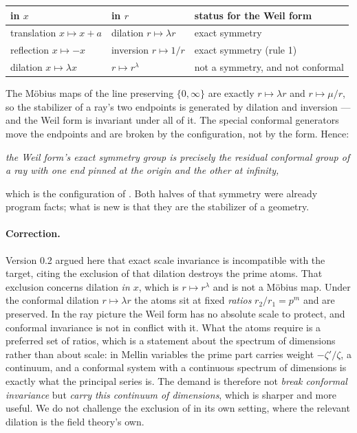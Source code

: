 \begin{center}
\begin{tabular}{@{}lll@{}}
\toprule
in $x$ & in $r$ & status for the Weil form\\
\midrule
translation $x\mapsto x+a$ & dilation $r\mapsto\lambda r$ & exact symmetry\\
reflection $x\mapsto-x$ & inversion $r\mapsto1/r$ & exact symmetry (rule 1)\\
dilation $x\mapsto\lambda x$ & $r\mapsto r^\lambda$ & not a symmetry, and not conformal\\
\bottomrule
\end{tabular}
\end{center}

The Möbius maps of the line preserving $\{0,\infty\}$ are exactly
$r\mapsto\lambda r$ and $r\mapsto\mu/r$, so the stabilizer of a ray's two
endpoints is generated by dilation and inversion --- and the Weil form is
invariant under all of it. The special conformal generators move the endpoints
and are broken by the configuration, not by the form. Hence:

\begin{center}
\emph{the Weil form's exact symmetry group is precisely the residual conformal
group of a ray with one end pinned at the origin and the other at infinity,}
\end{center}

which is the configuration of \cite{OWL}. Both halves of that symmetry were
already program facts; what is new is that they are the stabilizer of a geometry.

\paragraph{Correction.} Version 0.2 argued here that exact scale invariance is
incompatible with the target, citing the exclusion of \cite{ExclusionMap} that
dilation destroys the prime atoms. That exclusion concerns dilation \emph{in
$x$}, which is $r\mapsto r^\lambda$ and is not a Möbius map. Under the conformal
dilation $r\mapsto\lambda r$ the atoms sit at fixed \emph{ratios}
$r_2/r_1=p^m$ and are preserved. In the ray picture the Weil form has no absolute
scale to protect, and conformal invariance is not in conflict with it. What the
atoms require is a preferred set of ratios, which is a statement about the
spectrum of dimensions rather than about scale: in Mellin variables the prime
part carries weight $-\zeta'/\zeta$, a continuum, and a conformal system with a
continuous spectrum of dimensions is exactly what the principal series is. The
demand is therefore not \emph{break conformal invariance} but \emph{carry this
continuum of dimensions}, which is sharper and more useful. We do not challenge
the exclusion of \cite{ExclusionMap} in its own setting, where the relevant
dilation is the field theory's own.

